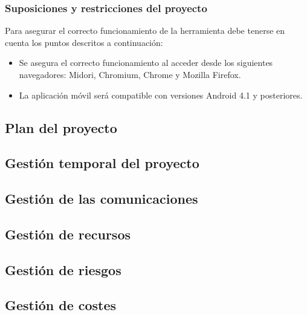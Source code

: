 		\subsubsection{Suposiciones y restricciones del proyecto}
		Para asegurar el correcto funcionamiento de la herramienta debe tenerse en cuenta los puntos descritos a continuación:
		
		\begin{itemize}[label={$\bullet$},labelindent=\parindent,leftmargin=2cm]
			\item Se asegura el correcto funcionamiento al acceder desde los siguientes navegadores: Midori, Chromium, Chrome y Mozilla Firefox.
			\item La aplicación móvil será compatible con versiones Android 4.1 y posteriores.
		\end{itemize}

	\subsection{Plan del proyecto}
	
	\subsection{Gestión temporal del proyecto}
	
	\subsection{Gestión de las comunicaciones}
	
	\subsection{Gestión de recursos}
	
	\subsection{Gestión de riesgos}
	
	\subsection{Gestión de costes}
	

